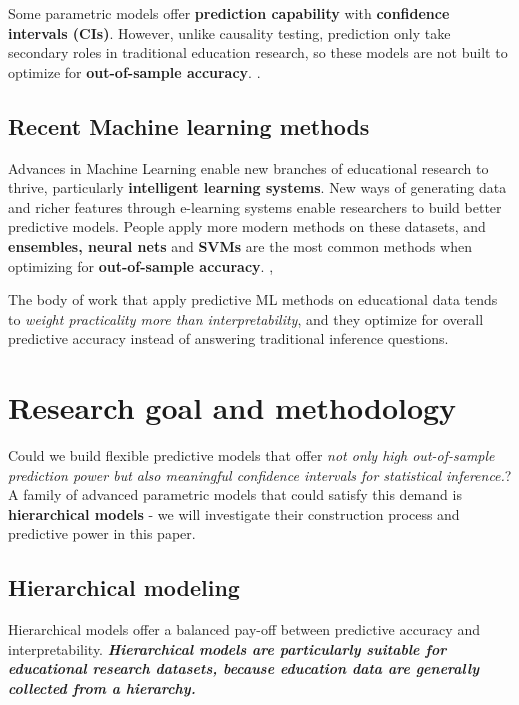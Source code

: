\documentclass{sigchi}
\begin{document}
Some parametric models offer \textbf{prediction capability} with 
\textbf{confidence intervals (CIs)}. However, unlike causality testing, prediction only take secondary roles in traditional education research,
so these models are not built to optimize for \textbf{out-of-sample accuracy}. \cite{romero2010educational}.

\subsection{Recent Machine learning methods}
Advances in Machine Learning enable new
branches of educational research to thrive, particularly \textbf{intelligent learning systems}. \cite{romero2010educational}
New ways of generating data and richer features through e-learning systems enable researchers to build better predictive models. People apply more modern methods on these datasets, and
\textbf{ensembles, neural nets} and \textbf{SVMs} are the most common methods
when optimizing for \textbf{out-of-sample accuracy}. \cite{shahiri2015review}, \cite{amrieh2016mining} 

The body of work that apply predictive ML methods
on educational data tends to \textit{weight practicality more than interpretability}, and
they optimize for overall predictive accuracy instead of answering traditional inference questions. \cite{romero2010educational, meier2016predicting}

\section{Research goal and methodology}
Could we build flexible predictive models
that offer \textit{not only high out-of-sample prediction
  power but also meaningful confidence intervals for statistical
  inference.}? A family of advanced parametric models that could satisfy this
demand is \textbf{hierarchical models} - we will investigate their construction
process and predictive power in this paper.

\subsection{Hierarchical modeling}
Hierarchical models offer a balanced pay-off between 
predictive accuracy and interpretability. \textit{\textbf{Hierarchical models are particularly suitable for
educational research datasets, because education data are generally collected
from a hierarchy.}} \cite{
skrondal2009prediction, kaplan2016causal} 
\end{document}
